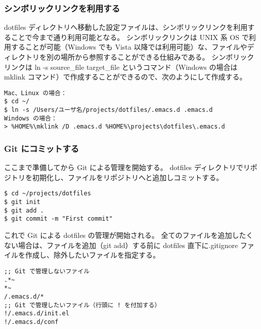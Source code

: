 \subsubsection{シンボリックリンクを利用する}
dotfiles ディレクトリへ移動した設定ファイルは、シンボリックリンクを利用することで今まで通り利用可能となる。
シンボリックリンクは UNIX 系 OS で利用することが可能（Windows でも Vista 以降では利用可能）な、ファイルやディレクトリを別の場所から参照することができる仕組みである。
シンボリックリンクは ln -s source\_file target\_file というコマンド（Windows の場合は mklink コマンド）で作成することができるので、次のようにして作成する。
\begin{mdframed}[roundcorner=0.50zw,leftmargin=3.00zw,rightmargin=3.00zw,skipabove=0.40zw,skipbelow=0.40zw,innertopmargin=4.00pt,innerbottommargin=4.00pt,innerleftmargin=5.00pt,innerrightmargin=5.00pt,linecolor=gray!090,linewidth=0.50pt,backgroundcolor=gray!90]\color{gray!10}
\begin{verbatim}
Mac、Linux の場合：
$ cd ~/
$ ln -s /Users/ユーザ名/projects/dotfiles/.emacs.d .emacs.d
Windows の場合：
> %HOME%\mklink /D .emacs.d %HOME%\projects\dotfiles\.emacs.d
\end{verbatim}
\end{mdframed}
\subsubsection{Git にコミットする}
ここまで準備してから Git による管理を開始する。
dotfiles ディレクトリでリポジトリを初期化し、ファイルをリポジトリへと追加しコミットする。\enlargethispage{1.750zw}
\begin{mdframed}[roundcorner=0.50zw,leftmargin=3.00zw,rightmargin=3.00zw,skipabove=0.40zw,skipbelow=0.40zw,innertopmargin=4.00pt,innerbottommargin=4.00pt,innerleftmargin=5.00pt,innerrightmargin=5.00pt,linecolor=gray!090,linewidth=0.50pt,backgroundcolor=gray!90]\color{gray!10}
\begin{verbatim}
$ cd ~/projects/dotfiles
$ git init
$ git add .
$ git commit -m "First commit"
\end{verbatim}
\end{mdframed}
これで Git による dotfiles の管理が開始される。
全てのファイルを追加したくない場合は、ファイルを追加（git add）する前に dotfiles 直下に.gitignore ファイルを作成し、除外したいファイルを指定する。
\begin{mdframed}[roundcorner=0.50zw,leftmargin=3.00zw,rightmargin=3.00zw,skipabove=0.40zw,skipbelow=0.40zw,innertopmargin=4.00pt,innerbottommargin=4.00pt,innerleftmargin=5.00pt,innerrightmargin=5.00pt,linecolor=gray!020,linewidth=0.50pt,backgroundcolor=gray!20]
\begin{verbatim}
;; Git で管理しないファイル
.*~
*~
/.emacs.d/*
;; Git で管理したいファイル（行頭に ! を付加する）
!/.emacs.d/init.el
!/.emacs.d/conf
\end{verbatim}
\end{mdframed}
